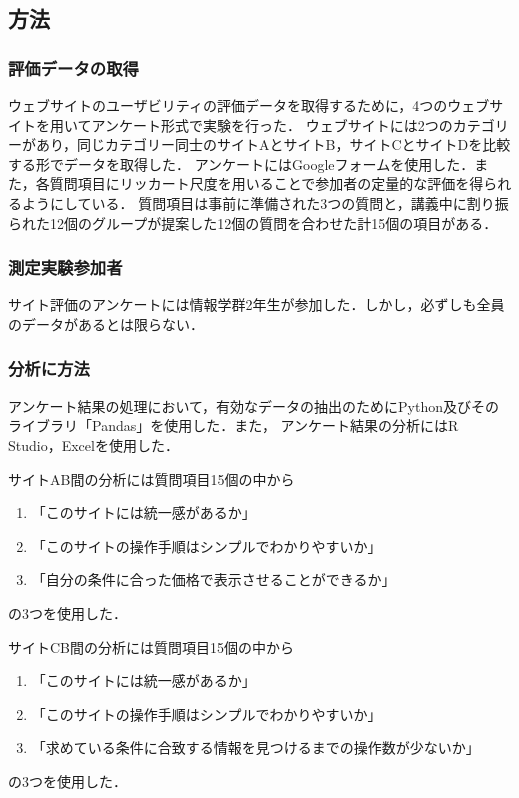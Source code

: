 \documentclass[titlepage]{jlreq}
\begin{document}
\subsection{方法}

\subsubsection{評価データの取得}
ウェブサイトのユーザビリティの評価データを取得するために，4つのウェブサイトを用いてアンケート形式で実験を行った．
ウェブサイトには2つのカテゴリーがあり，同じカテゴリー同士のサイトAとサイトB，サイトCとサイトDを比較する形でデータを取得した．
アンケートにはGoogleフォームを使用した．また，各質問項目にリッカート尺度を用いることで参加者の定量的な評価を得られるようにしている．
質問項目は事前に準備された3つの質問と，講義中に割り振られた12個のグループが提案した12個の質問を合わせた計15個の項目がある．

\subsubsection{測定実験参加者}
サイト評価のアンケートには情報学群2年生が参加した．しかし，必ずしも全員のデータがあるとは限らない．

\subsubsection{分析に方法}
アンケート結果の処理において，有効なデータの抽出のためにPython及びそのライブラリ「Pandas」を使用した．また，
アンケート結果の分析にはR Studio，Excelを使用した．

サイトAB間の分析には質問項目15個の中から
\begin{enumerate}[label=\textbf{質問\arabic*.},leftmargin=2cm]
    \item 「このサイトには統一感があるか」
    \item 「このサイトの操作手順はシンプルでわかりやすいか」
    \item 「自分の条件に合った価格で表示させることができるか」
\end{enumerate}
の3つを使用した．

サイトCB間の分析には質問項目15個の中から
\begin{enumerate}[label=\textbf{質問\arabic*.},leftmargin=2cm]
    \item 「このサイトには統一感があるか」
    \item 「このサイトの操作手順はシンプルでわかりやすいか」
    \item 「求めている条件に合致する情報を見つけるまでの操作数が少ないか」
\end{enumerate}
の3つを使用した．
\end{document}
